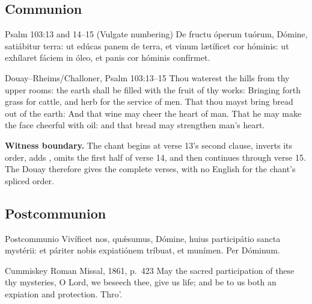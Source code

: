 \elementguard
\subsection*{Communion }
\begin{appointedlatin}{Psalm 103:13 and 14--15 (Vulgate numbering)}
De fructu óperum tuórum, Dómine, satiábitur terra: ut edúcas panem de terra,
et vinum lætíficet cor hóminis: ut exhílaret fáciem in óleo, et panis cor
hóminis confírmet.
\end{appointedlatin}
\begin{namedtranslation}{Douay--Rheims/Challoner, Psalm 103:13--15}
Thou waterest the hills from thy upper rooms: the earth shall be filled with
the fruit of thy works: Bringing forth grass for cattle, and herb for the
service of men. That thou mayst bring bread out of the earth: And that wine may
cheer the heart of man. That he may make the face cheerful with oil: and that
bread may strengthen man's heart.

\textbf{Witness boundary.} The chant begins at verse 13's second clause,
inverts its order, adds , omits the first half of verse 14, and
then continues through verse 15. The Douay therefore gives the complete
verses, with no English for the chant's spliced order.
\end{namedtranslation}

\elementguard
\subsection*{Postcommunion }
\begin{appointedlatin}{Postcommunio}
Vivíficet nos, quǽsumus, Dómine, huius participátio sancta mystérii: et
páriter nobis expiatiónem tríbuat, et munímen. Per Dóminum.
\end{appointedlatin}
\begin{namedtranslation}{Cummiskey Roman Missal, 1861, p.~423}
May the sacred participation of these thy mysteries, O Lord, we beseech thee,
give us life; and be to us both an expiation and protection. Thro'.
\end{namedtranslation}
